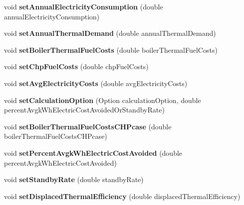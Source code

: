 \begin{DoxyCompactItemize}
\mbox{\label{class_c_h_p_a306aa3de555bb7dbd79e7aeb1658713e}} 
void {\bfseries set\+Annual\+Electricity\+Consumption} (double annual\+Electricity\+Consumption)
\item 
\mbox{\label{class_c_h_p_aa7abaae6cf4d62059eff750498d70076}} 
void {\bfseries set\+Annual\+Thermal\+Demand} (double annual\+Thermal\+Demand)
\item 
\mbox{\label{class_c_h_p_a13c93cd6b6bba4d52b2f8fd10638724e}} 
void {\bfseries set\+Boiler\+Thermal\+Fuel\+Costs} (double boiler\+Thermal\+Fuel\+Costs)
\item 
\mbox{\label{class_c_h_p_a419c9eaf0ad6009bb3dd753e4b1dd63b}} 
void {\bfseries set\+Chp\+Fuel\+Costs} (double chp\+Fuel\+Costs)
\item 
\mbox{\label{class_c_h_p_ad953f7558bf3a38816e29d9ffaf6273c}} 
void {\bfseries set\+Avg\+Electricity\+Costs} (double avg\+Electricity\+Costs)
\item 
\mbox{\label{class_c_h_p_abfa71c23fa4b58c03c3337b57ba0d56d}} 
void {\bfseries set\+Calculation\+Option} (Option calculation\+Option, double percent\+Avgk\+Wh\+Electric\+Cost\+Avoided\+Or\+Standby\+Rate)
\item 
\mbox{\label{class_c_h_p_a319f1e915035b2dface2dbad67c65017}} 
void {\bfseries set\+Boiler\+Thermal\+Fuel\+Costs\+C\+H\+Pcase} (double boiler\+Thermal\+Fuel\+Costs\+C\+H\+Pcase)
\item 
\mbox{\label{class_c_h_p_a002b9e405c3a1777b306430cd1bbbec3}} 
void {\bfseries set\+Percent\+Avgk\+Wh\+Electric\+Cost\+Avoided} (double percent\+Avgk\+Wh\+Electric\+Cost\+Avoided)
\item 
\mbox{\label{class_c_h_p_ac25d489d5d3e336f7286c0124f81d3c5}} 
void {\bfseries set\+Standby\+Rate} (double standby\+Rate)
\item 
\mbox{\label{class_c_h_p_a6f80ede27800dfdeb0493e0501823fde}} 
void {\bfseries set\+Displaced\+Thermal\+Efficiency} (double displaced\+Thermal\+Efficiency)
\item 

\end{DoxyCompactItemize}
